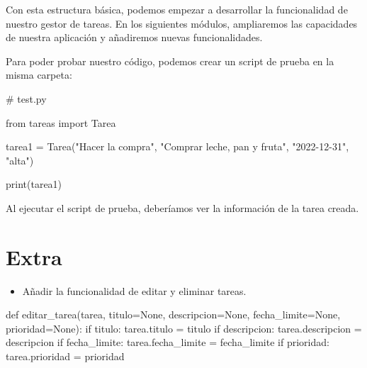 \documentclass[
  a4paper,
  DIV=11,
  numbers=noendperiod,
  onepage,
  openany]{scrreprt}
\newenvironment{Shaded}{\begin{snugshade}}{\end{snugshade}}
\newcommand{\AttributeTok}[1]{\textcolor[rgb]{0.40,0.45,0.13}{#1}}
\newcommand{\BuiltInTok}[1]{\textcolor[rgb]{0.00,0.23,0.31}{#1}}
\newcommand{\CommentTok}[1]{\textcolor[rgb]{0.37,0.37,0.37}{#1}}
\newcommand{\ControlFlowTok}[1]{\textcolor[rgb]{0.00,0.23,0.31}{#1}}
\newcommand{\ExtensionTok}[1]{\textcolor[rgb]{0.00,0.23,0.31}{#1}}
\newcommand{\ImportTok}[1]{\textcolor[rgb]{0.00,0.46,0.62}{#1}}
\newcommand{\KeywordTok}[1]{\textcolor[rgb]{0.00,0.23,0.31}{#1}}
\newcommand{\NormalTok}[1]{\textcolor[rgb]{0.00,0.23,0.31}{#1}}
\newcommand{\OperatorTok}[1]{\textcolor[rgb]{0.37,0.37,0.37}{#1}}
\newcommand{\StringTok}[1]{\textcolor[rgb]{0.13,0.47,0.30}{#1}}
\newcommand{\VariableTok}[1]{\textcolor[rgb]{0.07,0.07,0.07}{#1}}
\providecommand{\tightlist}{%
  \setlength{\itemsep}{0pt}\setlength{\parskip}{0pt}}\usepackage{longtable,booktabs,array}
\begin{document}
Con esta estructura básica, podemos empezar a desarrollar la
funcionalidad de nuestro gestor de tareas. En los siguientes módulos,
ampliaremos las capacidades de nuestra aplicación y añadiremos nuevas
funcionalidades.

Para poder probar nuestro código, podemos crear un script de prueba en
la misma carpeta:

\begin{Shaded}
\begin{Highlighting}[]
\CommentTok{\# test.py}

\ImportTok{from}\NormalTok{ tareas }\ImportTok{import}\NormalTok{ Tarea}

\NormalTok{tarea1 }\OperatorTok{=}\NormalTok{ Tarea(}\StringTok{"Hacer la compra"}\NormalTok{, }\StringTok{"Comprar leche, pan y fruta"}\NormalTok{, }\StringTok{"2022{-}12{-}31"}\NormalTok{, }\StringTok{"alta"}\NormalTok{)}

\BuiltInTok{print}\NormalTok{(tarea1)}
\end{Highlighting}
\end{Shaded}

Al ejecutar el script de prueba, deberíamos ver la información de la
tarea creada.

\begin{Shaded}
\end{Shaded}

\chapter{Extra 🎁}\label{extra}

\begin{itemize}
\tightlist
\item
  Añadir la funcionalidad de editar y eliminar tareas.
\end{itemize}

\begin{Shaded}
\begin{Highlighting}[]
\KeywordTok{def}\NormalTok{ editar\_tarea(tarea, titulo}\OperatorTok{=}\VariableTok{None}\NormalTok{, descripcion}\OperatorTok{=}\VariableTok{None}\NormalTok{, fecha\_limite}\OperatorTok{=}\VariableTok{None}\NormalTok{, prioridad}\OperatorTok{=}\VariableTok{None}\NormalTok{):}
    \ControlFlowTok{if}\NormalTok{ titulo:}
\NormalTok{        tarea.titulo }\OperatorTok{=}\NormalTok{ titulo}
    \ControlFlowTok{if}\NormalTok{ descripcion:}
\NormalTok{        tarea.descripcion }\OperatorTok{=}\NormalTok{ descripcion}
    \ControlFlowTok{if}\NormalTok{ fecha\_limite:}
\NormalTok{        tarea.fecha\_limite }\OperatorTok{=}\NormalTok{ fecha\_limite}
    \ControlFlowTok{if}\NormalTok{ prioridad:}
\NormalTok{        tarea.prioridad }\OperatorTok{=}\NormalTok{ prioridad}
\end{Highlighting}
\end{Shaded}
\end{document}
